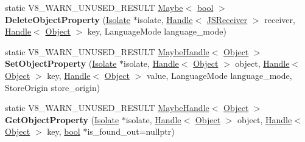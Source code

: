 \begin{DoxyCompactItemize}
static V8\+\_\+\+W\+A\+R\+N\+\_\+\+U\+N\+U\+S\+E\+D\+\_\+\+R\+E\+S\+U\+LT \mbox{\hyperlink{classv8_1_1Maybe}{Maybe}}$<$ \mbox{\hyperlink{classbool}{bool}} $>$ {\bfseries Delete\+Object\+Property} (\mbox{\hyperlink{classv8_1_1internal_1_1Isolate}{Isolate}} $\ast$isolate, \mbox{\hyperlink{classv8_1_1internal_1_1Handle}{Handle}}$<$ \mbox{\hyperlink{classv8_1_1internal_1_1JSReceiver}{J\+S\+Receiver}} $>$ receiver, \mbox{\hyperlink{classv8_1_1internal_1_1Handle}{Handle}}$<$ \mbox{\hyperlink{classv8_1_1internal_1_1Object}{Object}} $>$ key, Language\+Mode language\+\_\+mode)
\item 
\mbox{\label{classv8_1_1internal_1_1Runtime_a46ff3b7bd9352ed3c6b07a7247a2c5fc}} 
static V8\+\_\+\+W\+A\+R\+N\+\_\+\+U\+N\+U\+S\+E\+D\+\_\+\+R\+E\+S\+U\+LT \mbox{\hyperlink{classv8_1_1internal_1_1MaybeHandle}{Maybe\+Handle}}$<$ \mbox{\hyperlink{classv8_1_1internal_1_1Object}{Object}} $>$ {\bfseries Set\+Object\+Property} (\mbox{\hyperlink{classv8_1_1internal_1_1Isolate}{Isolate}} $\ast$isolate, \mbox{\hyperlink{classv8_1_1internal_1_1Handle}{Handle}}$<$ \mbox{\hyperlink{classv8_1_1internal_1_1Object}{Object}} $>$ object, \mbox{\hyperlink{classv8_1_1internal_1_1Handle}{Handle}}$<$ \mbox{\hyperlink{classv8_1_1internal_1_1Object}{Object}} $>$ key, \mbox{\hyperlink{classv8_1_1internal_1_1Handle}{Handle}}$<$ \mbox{\hyperlink{classv8_1_1internal_1_1Object}{Object}} $>$ value, Language\+Mode language\+\_\+mode, Store\+Origin store\+\_\+origin)
\item 
\mbox{\label{classv8_1_1internal_1_1Runtime_a258472be83131d3137616a91f3a8f383}} 
static V8\+\_\+\+W\+A\+R\+N\+\_\+\+U\+N\+U\+S\+E\+D\+\_\+\+R\+E\+S\+U\+LT \mbox{\hyperlink{classv8_1_1internal_1_1MaybeHandle}{Maybe\+Handle}}$<$ \mbox{\hyperlink{classv8_1_1internal_1_1Object}{Object}} $>$ {\bfseries Get\+Object\+Property} (\mbox{\hyperlink{classv8_1_1internal_1_1Isolate}{Isolate}} $\ast$isolate, \mbox{\hyperlink{classv8_1_1internal_1_1Handle}{Handle}}$<$ \mbox{\hyperlink{classv8_1_1internal_1_1Object}{Object}} $>$ object, \mbox{\hyperlink{classv8_1_1internal_1_1Handle}{Handle}}$<$ \mbox{\hyperlink{classv8_1_1internal_1_1Object}{Object}} $>$ key, \mbox{\hyperlink{classbool}{bool}} $\ast$is\+\_\+found\+\_\+out=nullptr)
\item 
\mbox{\label{classv8_1_1internal_1_1Runtime_a160c8a6a276c94cdc522483e36c2347b}} 

\end{DoxyCompactItemize}
